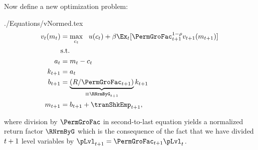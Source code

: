 \documentclass[SolvingMicroDSOPs]{subfiles}
\begin{document}
Now define a new optimization problem:
\begin{verbatimwrite}{./Equations/vNormed.tex}
  \begin{equation}\begin{gathered}\begin{aligned}
        \vFunc_{\prd}(\mNrm_{\prd}) & = \max_{{\cNrm}_{\prd}} ~~ \uFunc(\cNrm_{\prd})+\DiscFac \Ex_{\prd}[ \PermGroFac_{\prd+1}^{1-\CRRA}\vFunc_{\prd+1}(\mNrm_{\prd+1})] \label{eq:vNormed}                   \\
                                         & \text{s.t.}                                                                                 \\
        \aNrm_{\prd}                       & = \mNrm_{\prd}-\cNrm_{\prd}                                                                     \\
        \kNrm_{\prd+1}                     & = \aNrm_{\prd}                                                                                \\
        \bNrm_{\prd+1}                     & = \underbrace{\left(\Rfree/\PermGroFac_{\prd+1}\right)}_{\equiv \RNrmByG_{\prd+1}}\kNrm_{\prd+1} \\
        \mNrm_{t+1}                        & = \bNrm_{t+1}+\tranShkEmp_{t+1},
      \end{aligned}\end{gathered}\end{equation}
\end{verbatimwrite}
\unskip
where division by $\PermGroFac$ in second-to-last equation yields a normalized return factor $\RNrmByG$ which is the consequence of the fact that we have divided $t+1$ level variables by $\pLvl_{\prd+1}=\PermGroFac_{\prd+1}\pLvl_{\prd}$.

\ifpseudo{ %
\nopagebreak
  }{}
  
\end{document}

